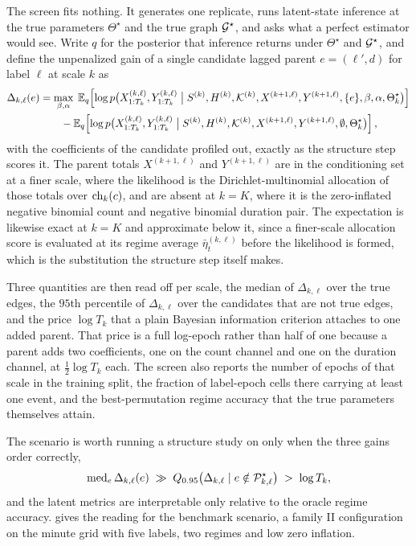 The screen fits nothing. It generates one replicate, runs latent-state
inference at the true parameters \(\Theta^\star\) and the true graph
\({\mathcal{G}}^\star\), and asks what a perfect estimator would see. Write \(q\) for the
posterior that inference returns under \(\Theta^\star\) and \({\mathcal{G}}^\star\), and
define the unpenalized gain of a single candidate lagged parent
\(e = (\ell', d)\) for label \(\ell\) at scale \(k\) as
\begin{align}
\Delta_{k,\ell}(e)
&=
\max_{\beta,\alpha}\;
\mathbb{E}_q\!\left[
\log p\bigl(X^{(k,\ell)}_{1:T_k}, Y^{(k,\ell)}_{1:T_k}
\bigm| S^{(k)}, H^{(k)}, {\mathcal{K}}^{(k)}, X^{(k+1,\ell)}, Y^{(k+1,\ell)},
\{e\}, \beta, \alpha, \Theta_k^\star\bigr)
\right]
\nonumber \\
&\qquad -
\mathbb{E}_q\!\left[
\log p\bigl(X^{(k,\ell)}_{1:T_k}, Y^{(k,\ell)}_{1:T_k}
\bigm| S^{(k)}, H^{(k)}, {\mathcal{K}}^{(k)}, X^{(k+1,\ell)}, Y^{(k+1,\ell)},
\emptyset, \Theta_k^\star\bigr)
\right],
\label{eq:probe_gain}
\end{align}
with the coefficients of the candidate profiled out, exactly as the structure
step scores it. The parent totals \(X^{(k+1,\ell)}\) and \(Y^{(k+1,\ell)}\) are
in the conditioning set at a finer scale, where the likelihood is the
Dirichlet-multinomial allocation of those totals over \(\operatorname{ch}_k(c)\), and are
absent at \(k = K\), where it is the zero-inflated negative binomial count and
negative binomial duration pair. The expectation is likewise exact at \(k = K\)
and approximate below it, since a finer-scale allocation score is evaluated at
its regime average \(\bar{\eta}_t^{(k,\ell)}\) before the likelihood is formed,
which is the substitution the structure step itself makes.

Three quantities are then read off per scale, the median of
\(\Delta_{k,\ell}\) over the true edges, the \(95\)th percentile of
\(\Delta_{k,\ell}\) over the candidates that are not true edges, and the price
\(\log T_k\) that a plain Bayesian information criterion attaches to one added
parent. That price is a full log-epoch rather than half of one because a
parent adds two coefficients, one on the count channel and one on the duration
channel, at \(\tfrac{1}{2}\log T_k\) each. The screen also reports the number
of epochs of that scale in the training split, the fraction of label-epoch
cells there carrying at least one event, and the best-permutation regime
accuracy that the true parameters themselves attain.

The scenario is worth running a structure study on only when the three gains
order correctly,
\begin{align}
\operatorname{med}_e \Delta_{k,\ell}(e)
\;\gg\;
Q_{0.95}\bigl(\Delta_{k,\ell} \mid e \notin {\mathcal{P}}_{k,\ell}^\star\bigr)
\;>\;
\log T_k ,
\label{eq:probe_ordering}
\end{align}
and the latent metrics are interpretable only relative to the oracle regime
accuracy.  gives the reading for the benchmark scenario, a
family II configuration on the minute grid with five labels, two regimes and
low zero inflation.

